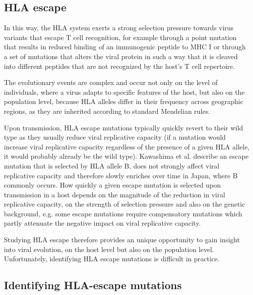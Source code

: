 \documentclass[fleqn,11pt]{SelfArx} %
\begin{document}
\subsection{HLA escape}
In this way, the HLA system exerts a strong selection pressure towards virus variants
that escape T cell recognition, for example through a point mutation
that results in reduced binding of an immunogenic peptide to MHC I or through a
set of mutations that alters the viral protein in such a way that it is cleaved into 
different peptides that are not recognized by the host's T cell repertoire.

The evolutionary events are complex and occur not only on the level of individuals, 
where a virus adapts to specific features of the host, but also on the population level,
because HLA alleles differ in their frequency across geographic regions, as they are inherited
according to standard Mendelian rules.

Upon transmission, HLA escape mutations typically quickly revert to their wild type
as they usually reduce viral replicative capacity (if a mutation would increase
viral replicative capacity regardless of the presence of a given HLA allele, it would
probably already be the wild type). Kawashima et al.
describe an escape mutation that is selected by HLA allele B,
does not strongly affect viral replicative capacity and therefore slowly enriches
over time in Japan, where B commonly occurs.
How quickly a given escape mutation is selected upon transmission in a host depends on the
magnitude of the reduction in viral replicative capacity, on the strength of selection
pressure and also on the genetic background, e.g. some escape mutations require compensatory 
mutations which partly attenuate the negative impact on viral replicative capacity.

Studying HLA escape therefore provides an unique opportunity to gain insight into
viral evolution, on the host level but also on the population level.
Unfortunately, identifying HLA escape mutations is difficult in practice.

\subsection{Identifying HLA-escape mutations}
\end{document}
